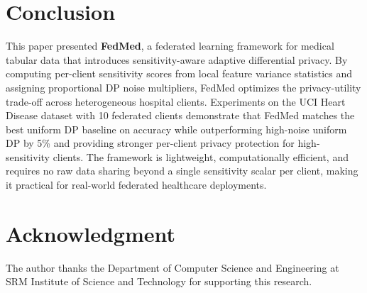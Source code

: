\documentclass[journal]{IEEEtran}
\begin{document}
\section{Conclusion}
\label{sec:conclusion}

This paper presented \textbf{FedMed}, a federated learning framework for
medical tabular data that introduces sensitivity-aware adaptive differential
privacy. By computing per-client sensitivity scores from local feature variance
statistics and assigning proportional DP noise multipliers, FedMed optimizes
the privacy-utility trade-off across heterogeneous hospital clients.
Experiments on the UCI Heart Disease dataset with 10 federated clients
demonstrate that FedMed matches the best uniform DP baseline on accuracy while
outperforming high-noise uniform DP by 5\% and providing stronger per-client
privacy protection for high-sensitivity clients. The framework is lightweight,
computationally efficient, and requires no raw data sharing beyond a single
sensitivity scalar per client, making it practical for real-world federated
healthcare deployments.

\section*{Acknowledgment}
The author thanks the Department of Computer Science and Engineering at
SRM Institute of Science and Technology for supporting this research.
\end{document}
